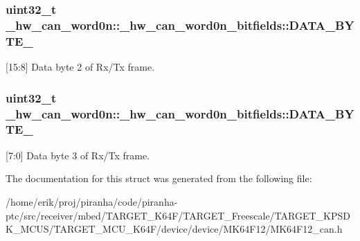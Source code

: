 \subsubsection[{\texorpdfstring{D\+A\+T\+A\+\_\+\+B\+Y\+T\+E\+\_\+2}{DATA_BYTE_2}}]{\setlength{\rightskip}{0pt plus 5cm}uint32\+\_\+t \+\_\+hw\+\_\+can\+\_\+word0n\+::\+\_\+hw\+\_\+can\+\_\+word0n\+\_\+bitfields\+::\+D\+A\+T\+A\+\_\+\+B\+Y\+T\+E\+\_}\hypertarget{struct__hw__can__word0n_1_1__hw__can__word0n__bitfields_ab0335597c49a2dec00d7af030d668eda}{}\label{struct__hw__can__word0n_1_1__hw__can__word0n__bitfields_ab0335597c49a2dec00d7af030d668eda}
\mbox{[}15\+:8\mbox{]} Data byte 2 of Rx/\+Tx frame. 
\subsubsection[{\texorpdfstring{D\+A\+T\+A\+\_\+\+B\+Y\+T\+E\+\_\+3}{DATA_BYTE_3}}]{\setlength{\rightskip}{0pt plus 5cm}uint32\+\_\+t \+\_\+hw\+\_\+can\+\_\+word0n\+::\+\_\+hw\+\_\+can\+\_\+word0n\+\_\+bitfields\+::\+D\+A\+T\+A\+\_\+\+B\+Y\+T\+E\+\_}\hypertarget{struct__hw__can__word0n_1_1__hw__can__word0n__bitfields_aeb0a1f388379469f4cdf88758c406421}{}\label{struct__hw__can__word0n_1_1__hw__can__word0n__bitfields_aeb0a1f388379469f4cdf88758c406421}
\mbox{[}7\+:0\mbox{]} Data byte 3 of Rx/\+Tx frame. 

The documentation for this struct was generated from the following file\+:\begin{DoxyCompactItemize}
\item 
/home/erik/proj/piranha/code/piranha-\/ptc/src/receiver/mbed/\+T\+A\+R\+G\+E\+T\+\_\+\+K64\+F/\+T\+A\+R\+G\+E\+T\+\_\+\+Freescale/\+T\+A\+R\+G\+E\+T\+\_\+\+K\+P\+S\+D\+K\+\_\+\+M\+C\+U\+S/\+T\+A\+R\+G\+E\+T\+\_\+\+M\+C\+U\+\_\+\+K64\+F/device/device/\+M\+K64\+F12/M\+K64\+F12\+\_\+can.\+h\end{DoxyCompactItemize}
